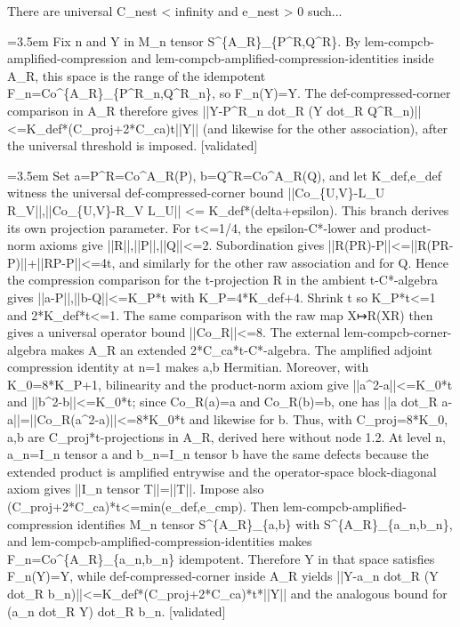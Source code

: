 \documentclass{article}
\newcommand{\step}[1]{\par\noindent\hangindent=3.5em\hangafter=1%
  \makebox[3.5em][l]{\textbf{#1.}}}
\newcommand{\steptag}[1]{\hfill{\small\textsf{[#1]}}}
\begin{document}
\begin{proofbox}{There are universal C\_nest < infinity and e\_nest > 0 such...}
\step{1.4.1} Fix n and Y in M\_n tensor S\textasciicircum{}\{A\_R\}\_\{P\textasciicircum{}R,Q\textasciicircum{}R\}. By lem-compcb-amplified-compression and lem-compcb-amplified-compression-identities inside A\_R, this space is the range of the idempotent F\_n=Co\textasciicircum{}\{A\_R\}\_\{P\textasciicircum{}R\_n,Q\textasciicircum{}R\_n\}, so F\_n(Y)=Y. The def-compressed-corner comparison in A\_R therefore gives ||Y-P\textasciicircum{}R\_n dot\_R (Y dot\_R Q\textasciicircum{}R\_n)||<=K\_def*(C\_proj+2*C\_ca)t||Y|| (and likewise for the other association), after the universal threshold is imposed. \steptag{validated} \\[6pt]
\step{1.4.1.1} Set a=P\textasciicircum{}R=Co\textasciicircum{}A\_R(P), b=Q\textasciicircum{}R=Co\textasciicircum{}A\_R(Q), and let K\_def,e\_def witness the universal def-compressed-corner bound ||Co\_\{U,V\}-L\_U R\_V||,||Co\_\{U,V\}-R\_V L\_U|| <= K\_def*(delta+epsilon). This branch derives its own projection parameter. For t<=1/4, the epsilon-C*-lower and product-norm axioms give ||R||,||P||,||Q||<=2. Subordination gives ||R(PR)-P||<=||R(PR-P)||+||RP-P||<=4t, and similarly for the other raw association and for Q. Hence the compression comparison for the t-projection R in the ambient t-C*-algebra gives ||a-P||,||b-Q||<=K\_P*t with K\_P=4*K\_def+4. Shrink t so K\_P*t<=1 and 2*K\_def*t<=1. The same comparison with the raw map X↦R(XR) then gives a universal operator bound ||Co\_R||<=8. The external lem-compcb-corner-algebra makes A\_R an extended 2*C\_ca*t-C*-algebra. The amplified adjoint compression identity at n=1 makes a,b Hermitian. Moreover, with K\_0=8*K\_P+1, bilinearity and the product-norm axiom give ||a\textasciicircum{}2-a||<=K\_0*t and ||b\textasciicircum{}2-b||<=K\_0*t; since Co\_R(a)=a and Co\_R(b)=b, one has ||a dot\_R a-a||=||Co\_R(a\textasciicircum{}2-a)||<=8*K\_0*t and likewise for b. Thus, with C\_proj=8*K\_0, a,b are C\_proj*t-projections in A\_R, derived here without node 1.2. At level n, a\_n=I\_n tensor a and b\_n=I\_n tensor b have the same defects because the extended product is amplified entrywise and the operator-space block-diagonal axiom gives ||I\_n tensor T||=||T||. Impose also (C\_proj+2*C\_ca)*t<=min(e\_def,e\_cmp). Then lem-compcb-amplified-compression identifies M\_n tensor S\textasciicircum{}\{A\_R\}\_\{a,b\} with S\textasciicircum{}\{A\_R\}\_\{a\_n,b\_n\}, and lem-compcb-amplified-compression-identities makes F\_n=Co\textasciicircum{}\{A\_R\}\_\{a\_n,b\_n\} idempotent. Therefore Y in that space satisfies F\_n(Y)=Y, while def-compressed-corner inside A\_R yields ||Y-a\_n dot\_R (Y dot\_R b\_n)||<=K\_def*(C\_proj+2*C\_ca)*t*||Y|| and the analogous bound for (a\_n dot\_R Y) dot\_R b\_n. \steptag{validated} \\[4pt]

\end{proofbox}
\end{document}

